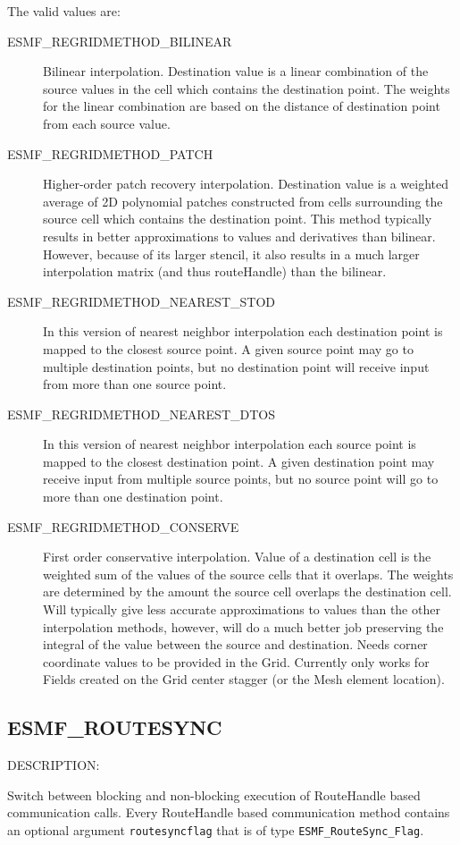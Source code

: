 The valid values are:
\begin{description}
\item [ESMF\_REGRIDMETHOD\_BILINEAR]
      Bilinear interpolation. Destination value is a linear combination of the source values in the cell which contains the destination point. The weights for the linear combination are based on the distance of destination point from each source value. 
\item [ESMF\_REGRIDMETHOD\_PATCH]
      Higher-order patch recovery interpolation. Destination value is a weighted average of 2D polynomial patches constructed from cells surrounding the source cell which contains the destination point. This method typically results in better approximations to values and derivatives than bilinear. However, because of its larger stencil, it also results in a much larger interpolation matrix (and thus routeHandle) than the bilinear. 
\item [ESMF\_REGRIDMETHOD\_NEAREST\_STOD]
      In this version of nearest neighbor interpolation each destination point is mapped to the closest source point. A given source point may go to multiple destination points, but no destination point will receive input from more than one source point. 
\item [ESMF\_REGRIDMETHOD\_NEAREST\_DTOS]
      In this version of nearest neighbor interpolation each source point is mapped to the closest destination point. A given destination point may receive input from multiple source points, but no source point will go to more than one destination point. 
\item [ESMF\_REGRIDMETHOD\_CONSERVE]
      First order conservative interpolation. Value of a destination cell is the weighted sum of the values of the source cells that it overlaps. The weights are determined by the amount the source cell overlaps the destination cell. Will typically give less accurate approximations to values than the other interpolation methods, however, will do a much better job preserving the integral of the value between the source and destination.  Needs corner coordinate values to be provided in the Grid. Currently only works for Fields created on the Grid center stagger (or the Mesh element location). 
\end{description}


\subsection{ESMF\_ROUTESYNC}
\label{const:routesync}
{\sf DESCRIPTION:\\}  
\begin{sloppypar}
Switch between blocking and non-blocking execution of RouteHandle based
communication calls. Every RouteHandle based communication method contains
an optional argument {\tt routesyncflag} that is of type {\tt ESMF\_RouteSync\_Flag}.
\end{sloppypar}

